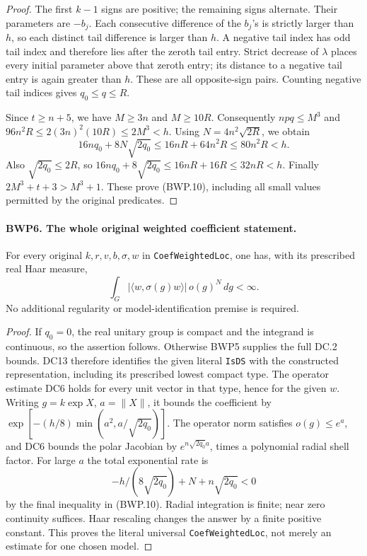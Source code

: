 \documentclass[11pt,a4paper]{article}
\numberwithin{equation}{section}
\theoremstyle{remark}\newtheorem{remark}[theorem]{Remark}
\begin{document}
\begin{proof}
The first \(k-1\) signs are positive; the remaining signs alternate.
Their parameters are \(-b_j\).  Each consecutive difference of
the \(b_j\)'s is strictly larger than \(h\), so each distinct
tail difference is larger than \(h\).  A negative tail index has
odd tail index and therefore lies after the zeroth tail entry.
Strict decrease of \(\lambda\) places every initial parameter
above that zeroth entry; its distance to a negative tail entry is
again greater than \(h\).  These are all opposite-sign pairs.
Counting negative tail indices gives \(q_0\le q\le R\).

Since \(t\ge n+5\), we have \(M\ge3n\) and \(M\ge10R\).
Consequently \(npq\le M^3\) and
\(96n^2R\le2(3n)^2(10R)\le2M^3<h\).
Using \(N=4n^2\sqrt{2R}\), we obtain
\[
 16nq_0+8N\sqrt{2q_0}
 \le16nR+64n^2R\le80n^2R<h.
\]
Also \(\sqrt{2q_0}\le2R\), so
\(16nq_0+8\sqrt{2q_0}\le16nR+16R\le32nR<h\).
Finally \(2M^3+t+3>M^3+1\).  These prove (BWP.10),
including all small values permitted by the original predicates.
\end{proof}

\paragraph{BWP6. The whole original weighted coefficient statement.}
\label{claim:BWP6}
For every original \(k,r,v,b,\sigma,w\) in
\texttt{Coef\allowbreak Weighted\allowbreak Loc}, one has, with its prescribed real Haar measure,
\[
 \int_G |\langle w,\sigma(g)w\rangle|\,o(g)^N\,dg<\infty.
 \tag{BWP.11}
\]
No additional regularity or model-identification premise is required.

\begin{proof}
If \(q_0=0\), the real unitary group is compact and the integrand
is continuous, so the assertion follows.  Otherwise BWP5 supplies
the full DC.2 bounds.  DC13 therefore identifies the given literal
\texttt{Is\allowbreak DS} with the constructed representation, including its
prescribed lowest compact type.  The operator estimate DC6 holds
for every unit vector in that type, hence for the given \(w\).
Writing \(g=k\exp X\), \(a=\|X\|\), it bounds the
coefficient by
\(\exp[-(h/8)\min(a^2,a/\sqrt{2q_0})]\).
The operator norm satisfies \(o(g)\le e^a\), and DC6 bounds the
polar Jacobian by \(e^{n\sqrt{2q_0}a}\), times a polynomial
radial shell factor.  For large \(a\) the total exponential rate is
\[
 -h/(8\sqrt{2q_0})+N+n\sqrt{2q_0}<0
\]
by the final inequality in (BWP.10).  Radial integration is finite;
near zero continuity suffices.  Haar rescaling changes the answer
by a finite positive constant.  This proves the literal universal
\texttt{Coef\allowbreak Weighted\allowbreak Loc}, not merely an estimate for one chosen model.
\end{proof}
\end{document}
